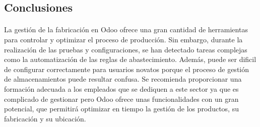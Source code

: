 \subsection{Conclusiones}
\paragraph{}
La gestión de la fabricación en Odoo ofrece una gran cantidad de herramientas para controlar y optimizar el proceso de producción. Sin embargo, durante la realización de las pruebas y configuraciones, se han detectado tareas complejas como la automatización de las reglas de abastecimiento. Además, puede ser dificil de configurar correctamente para usuarios novatos porque el proceso de gestión de almacenamientos puede resultar confusa. Se recomienda proporcionar una formación adecuada a los empleados que se dediquen a este sector ya que es complicado de gestionar pero Odoo ofrece unas funcionalidades con un gran potencial, que permitirá optimizar en tiempo la gestión de los productos, su fabricación y su ubicación.